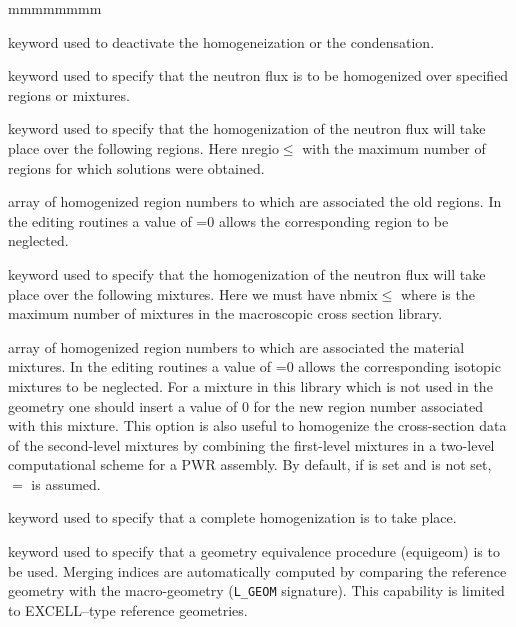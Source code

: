\begin{ListeDeDescription}{mmmmmmmm}
\item[\moc{NONE}] keyword used to deactivate the homogeneization or the condensation. 

\item[\moc{MERG}] keyword used to specify that the neutron flux is to be
homogenized over specified regions or mixtures. 

\item[\moc{REGI}] keyword used to specify that the homogenization of the neutron
flux will take place over the following regions. Here nregio$\le$
with  the maximum number of regions for which solutions were
obtained.

\item[\dusa{iregm}] array of homogenized region numbers to which are
associated the old regions. In the editing routines a value of =0
allows the corresponding region to be neglected. 

\item[\moc{MIX}] keyword used to specify that the homogenization of the neutron
flux will take place over the following mixtures. Here
we must have nbmix$\le$ where  is the maximum number
of mixtures in the macroscopic cross section library.  

\item[\dusa{imixm}] array of homogenized region numbers to which are
associated the material mixtures. In the editing routines a value of
=0 allows the corresponding isotopic mixtures to be neglected. For a mixture in this
library which is not used in the geometry one should insert a value of 0 for the
new region number associated with this mixture. This option is also useful to homogenize the cross-section data of the second-level mixtures by combining the first-level mixtures in
a two-level computational scheme for a PWR assembly. By default, if  is set and
 is not set, $=$ is assumed.

\item[\moc{COMP}] keyword used to specify that a complete homogenization is to take place. 

\item[\moc{GEO}] keyword used to specify that a geometry equivalence procedure (equigeom) is to be used. Merging indices
are automatically computed by comparing the reference geometry  with the macro-geometry  ({\tt L\_GEOM} signature).
This capability is limited to EXCELL--type reference geometries.


\end{ListeDeDescription}
